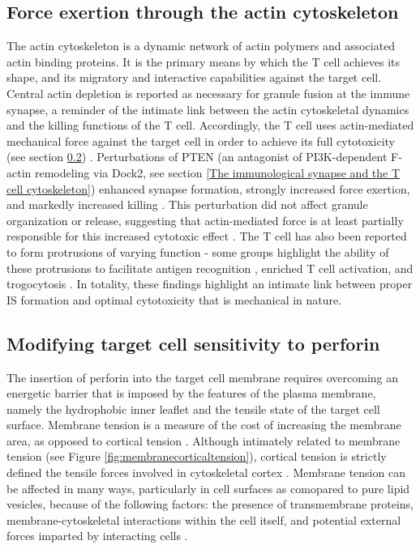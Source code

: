 \subsection{Force exertion through the actin cytoskeleton}
The actin cytoskeleton is a dynamic network of actin polymers and associated actin binding proteins. It is the primary means by which the T cell achieves its shape, and its migratory and interactive capabilities against the target cell. Central actin depletion is reported as necessary for granule fusion at the immune synapse, a reminder of the intimate link between the actin cytoskeletal dynamics and the killing functions of the T cell. Accordingly, the T cell uses actin-mediated mechanical force against the target cell in order to achieve its full cytotoxicity (see section \ref{Modifying target cell sensitivity to perforin}) \cite{Basu2016}. Perturbations of PTEN (an antagonist of PI3K-dependent F-actin remodeling via Dock2, see section \ref{The immunological synapse and the T cell cytoskeleton}) enhanced synapse formation, strongly increased force exertion, and markedly increased killing \cite{LeFloch2013, Basu2016}. This perturbation did not affect granule organization or release, suggesting that actin-mediated force is at least partially responsible for this increased cytotoxic effect \cite{Basu2016}. The T cell has also been reported to form protrusions of varying function - some groups highlight the ability of these protrusions to facilitate antigen recognition \cite{Sage2012}, enriched T cell activation\cite{Pettmann2018}, and trogocytosis \cite{Kim2018}. In totality, these findings highlight an intimate link between proper IS formation and optimal cytotoxicity that is mechanical in nature.

\subsection{Modifying target cell sensitivity to perforin}
\label{Modifying target cell sensitivity to perforin}
The insertion of perforin into the target cell membrane requires overcoming an energetic barrier that is imposed by the features of the plasma membrane, namely the hydrophobic inner leaflet and the tensile state of the target cell surface. Membrane tension is a measure of the cost of increasing the membrane area, as opposed to cortical tension \cite{Sitarska2020}. Although intimately related to membrane tension (see Figure \ref{fig:membranecorticaltension}), cortical tension is strictly defined the tensile forces involved in cytoskeletal cortex \cite{Sitarska2020}. Membrane tension can be affected in many ways, particularly in cell surfaces as comopared to pure lipid vesicles, because of the following factors: the presence of transmembrane proteins, membrane-cytoskeletal interactions within the cell itself, and potential external forces imparted by interacting cells \cite{Sitarska2020}. 

